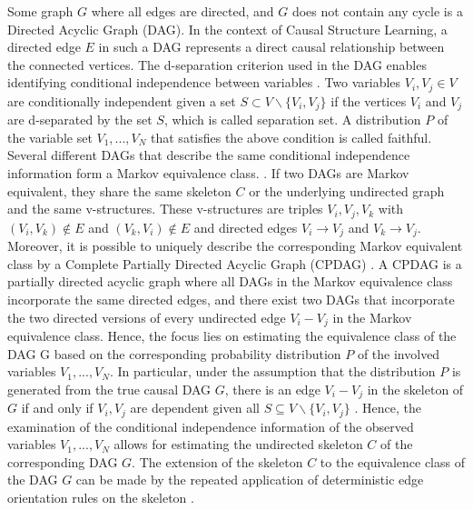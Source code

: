 Some graph $G$ where all edges are directed, and $G$ does not contain any cycle is a Directed Acyclic Graph (DAG). In the context of Causal Structure Learning, a directed edge $E$ in such a DAG represents a direct causal relationship between the connected vertices.
The d-separation criterion used in the DAG enables identifying conditional independence between variables \cite{geigerIdentifyingIndependenceBayesian1990}. Two variables $V_i, V_j \in V$ are conditionally independent given a set $S \subset V \backslash \{V_i, V_j\}$ if the vertices $V_i$ and $V_j$ are d-separated by the set $S$, which is called separation set.
A distribution $P$ of the variable set $V_1, ..., V_N$ that satisfies the above condition is called faithful.
Several different DAGs that describe the same conditional independence information form a Markov equivalence class. \cite{anderssonCharacterizationMarkovEquivalence1997}. If two DAGs are Markov equivalent, they share the same skeleton $C$ or the underlying undirected graph and the same v-structures.
These v-structures are triples $V_i,V_j,V_k$ with $(V_i,V_k) \notin E$ and $(V_k,V_i) \notin E$ and directed edges $V_i \rightarrow V_j$ and $V_k \rightarrow V_j$. Moreover, it is possible to uniquely describe the corresponding Markov equivalent class by a Complete Partially Directed Acyclic Graph (CPDAG) \cite{chickeringOptimalStructureIdentification2003}.
A CPDAG is a partially directed acyclic graph where all DAGs in the Markov equivalence class incorporate the same directed edges, and there exist two DAGs that incorporate the two directed versions of every undirected edge $V_i - V_j$ in the Markov equivalence class.
Hence, the focus lies on estimating the equivalence class of the DAG G based on the corresponding probability distribution $P$ of the involved variables $V_1,...,V_N$. In particular, under the assumption that the distribution $P$ is generated from the true causal DAG $G$, there is an edge $V_i - V_j$ in the skeleton of $G$ if and only if $V_i,V_j$ are dependent given all $S \subseteq V\backslash \{V_i,V_j\}$ \cite{spirtesCausationPredictionSearch1993}.
Hence, the examination of the conditional independence information of the observed variables $V_1,...,V_N$ allows for estimating the undirected skeleton $C$ of the corresponding DAG $G$. The extension of the skeleton $C$ to the equivalence class of the DAG $G$ can be made by the repeated application of deterministic edge orientation rules on the skeleton \cite{colomboOrderIndependentConstraintBasedCausal2014,kalischEstimatingHighDimensionalDirected2007,pearlIntroductionCausalInference2010}.

